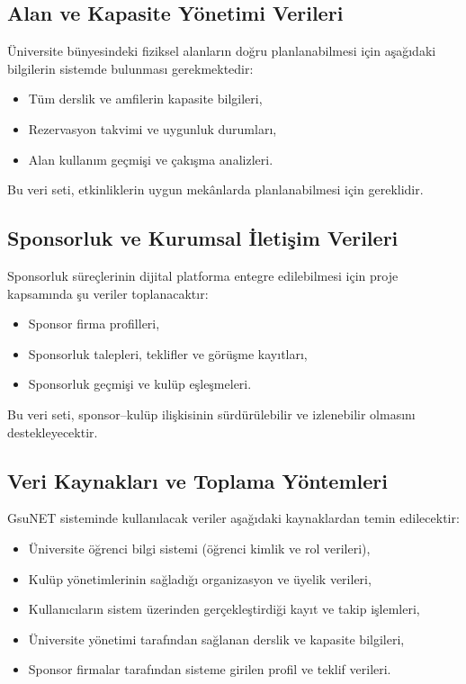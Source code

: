 \documentclass[a4paper,12pt]{report}
\begin{document}
\subsection{Alan ve Kapasite Yönetimi Verileri}

Üniversite bünyesindeki fiziksel alanların doğru planlanabilmesi için aşağıdaki bilgilerin sistemde bulunması gerekmektedir:

\begin{itemize}
    \item Tüm derslik ve amfilerin kapasite bilgileri,
    \item Rezervasyon takvimi ve uygunluk durumları,
    \item Alan kullanım geçmişi ve çakışma analizleri.
\end{itemize}

Bu veri seti, etkinliklerin uygun mekânlarda planlanabilmesi için gereklidir.

\subsection{Sponsorluk ve Kurumsal İletişim Verileri}

Sponsorluk süreçlerinin dijital platforma entegre edilebilmesi için proje kapsamında şu veriler toplanacaktır:

\begin{itemize}
    \item Sponsor firma profilleri,
    \item Sponsorluk talepleri, teklifler ve görüşme kayıtları,
    \item Sponsorluk geçmişi ve kulüp eşleşmeleri.
\end{itemize}

Bu veri seti, sponsor–kulüp ilişkisinin sürdürülebilir ve izlenebilir olmasını destekleyecektir.

\subsection{Veri Kaynakları ve Toplama Yöntemleri}

GsuNET sisteminde kullanılacak veriler aşağıdaki kaynaklardan temin edilecektir:

\begin{itemize}
    \item Üniversite öğrenci bilgi sistemi (öğrenci kimlik ve rol verileri),
    \item Kulüp yönetimlerinin sağladığı organizasyon ve üyelik verileri,
    \item Kullanıcıların sistem üzerinden gerçekleştirdiği kayıt ve takip işlemleri,
    \item Üniversite yönetimi tarafından sağlanan derslik ve kapasite bilgileri,
    \item Sponsor firmalar tarafından sisteme girilen profil ve teklif verileri.
\end{itemize}
\end{document}
